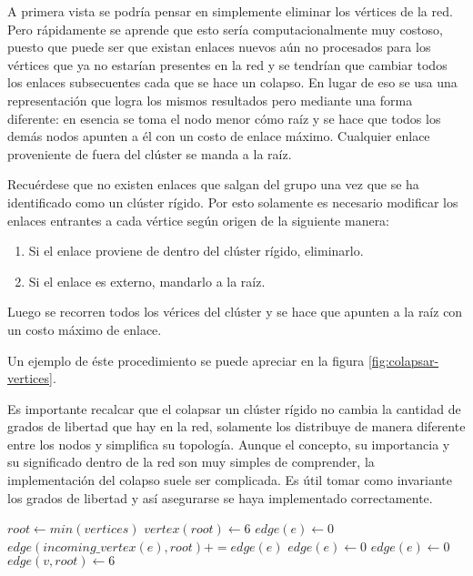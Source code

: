 A primera vista se podría pensar en simplemente eliminar los vértices de la red. Pero rápidamente se aprende que esto sería computacionalmente muy costoso, puesto que puede ser que existan enlaces nuevos aún no procesados para los vértices que ya no estarían presentes en la red y se tendrían que cambiar todos los enlaces subsecuentes cada que se hace un colapso. En lugar de eso se usa una representación que logra los mismos resultados pero mediante una forma diferente: en esencia se toma el nodo menor cómo raíz y se hace que todos los demás nodos apunten a él con un costo de enlace máximo. Cualquier enlace proveniente de fuera del clúster se manda a la raíz.

Recuérdese que no existen enlaces que salgan del grupo una vez que se ha identificado como un clúster rígido. Por esto solamente es necesario modificar los enlaces entrantes a cada vértice según origen de la siguiente manera:

\begin{enumerate}
	\item Si el enlace proviene de dentro del clúster rígido, eliminarlo.
	\item Si el enlace es externo, mandarlo a la raíz.
\end{enumerate}

Luego se recorren todos los vérices del clúster y se hace que apunten a la raíz con un costo máximo de enlace. 

Un ejemplo de éste procedimiento se puede apreciar en la figura \ref{fig:colapsar-vertices}.

Es importante recalcar que el colapsar un clúster rígido no cambia la cantidad de grados de libertad que hay en la red, solamente los distribuye de manera diferente entre los nodos y simplifica su topología. Aunque el concepto, su importancia y su significado dentro de la red son muy simples de comprender, la implementación del colapso suele ser complicada. Es útil tomar como invariante los grados de libertad y así asegurarse se haya implementado correctamente.

\begin{algorithm}
\begin{algorithmic}[1]
		\State
		\Return
	\EndIf
	\State $root \gets min(vertices)$
	\State $vertex(root) \gets 6$
			\State $edge(e) \gets 0$
		\EndIf
	\EndFor
			\State $edge(incoming\_vertex(e), root) \mathrel{{+}{=}} edge(e)$
			\State $edge(e) \gets 0$
		\EndFor
			\State $edge(e) \gets 0$
		\EndFor
		\State $edge(v, root) \gets 6$
	\EndFor
\EndFunction
\end{algorithmic}
\end{algorithm}

